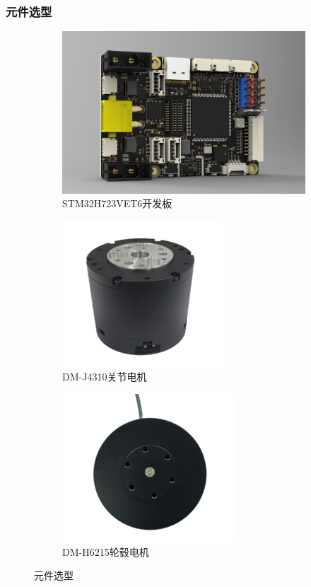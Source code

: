 \documentclass{beamer}
\begin{document}
	\begin{frame}
		\frametitle{元件选型}
		\begin{figure}[t]
			\centering
			\begin{subfigure}{0.45\textwidth}
				\centering
				\includegraphics[width=0.5\linewidth]{img/chapter2/2}
				\caption{STM32H723VET6开发板}
			\end{subfigure}
			\hfill
			\begin{subfigure}{0.45\textwidth}
				\centering
				\includegraphics[width=0.5\linewidth]{img/chapter2/3}
				\caption{DM-J4310关节电机}
			\end{subfigure}
			
			\begin{subfigure}{0.45\textwidth}
				\centering
				\includegraphics[width=0.5\linewidth]{img/chapter2/4}
				\caption{DM-H6215轮毂电机}
			\end{subfigure}
			\captionsetup{font=scriptsize} 
			\caption{元件选型}
		\end{figure}
	\end{frame}
\end{document}
